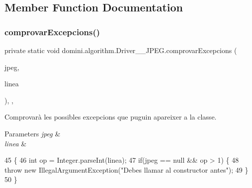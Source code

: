\subsection{Member Function Documentation}
\mbox{\label{classdomini_1_1algorithm_1_1Driver____JPEG_ae75883665dbbf55adaa8db46f2211c75}} 
\subsubsection{\texorpdfstring{comprovar\+Excepcions()}{comprovarExcepcions()}}
{\footnotesize\ttfamily private static void domini.\+algorithm.\+Driver\+\_\+\+\_\+\+J\+P\+E\+G.\+comprovar\+Excepcions (\begin{DoxyParamCaption}\item[{\hyperlink{classdomini_1_1algorithm_1_1JPEG}{J\+P\+EG}}]{jpeg,  }\item[{String}]{linea }\end{DoxyParamCaption})\hspace{0.3cm}{\ttfamily [inline]}, {\ttfamily [static]}, {\ttfamily [private]}}



Comprovarà les possibles excepcions que puguin apareixer a la classe. 


\begin{DoxyParams}{Parameters}
{\em jpeg} & \\
\hline
{\em linea} & \\
\hline
\end{DoxyParams}

\begin{DoxyCode}
45                                                                     \{
46         \textcolor{keywordtype}{int} op = Integer.parseInt(linea);
47         \textcolor{keywordflow}{if}(jpeg == null && op > 1) \{
48             \textcolor{keywordflow}{throw} \textcolor{keyword}{new} IllegalArgumentException(\textcolor{stringliteral}{"Debes llamar al constructor antes"});
49         \}
50     \}
\end{DoxyCode}
\mbox{\label{classdomini_1_1algorithm_1_1Driver____JPEG_a0e1370b743ad9782e31cb6b380dd60a5}} 

